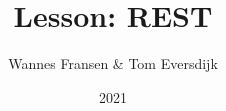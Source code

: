 \documentclass{beamer}
\title{Lesson: REST} %
\author{Wannes Fransen \& Tom Eversdijk}
\institute{UC Leuven}
\date{2021}
\begin{document}
\frame{\titlepage}



%
\end{document}
